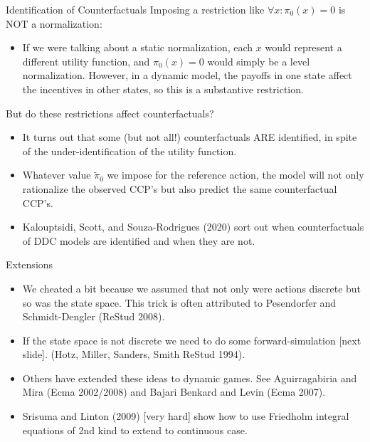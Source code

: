 \begin{frame}{Identification of Counterfactuals}
Imposing a restriction like $\forall x:\pi_{0}\left(x\right)=0$
is NOT a normalization: 
\begin{itemize}
\item If we were talking
about a static normalization, each $x$ would represent a different
utility function, and $\pi_{0}\left(x\right)=0$ would simply be a
level normalization. However, in a dynamic model, the payoffs in one
state affect the incentives in other states, so this is a \alert{substantive
restriction.}
\end{itemize}
But do these restrictions affect counterfactuals?
\begin{itemize}
\item It turns out that some (but not all!) counterfactuals ARE identified, in spite of the
under-identification of the utility function. 
\item Whatever value
$\widetilde{\pi}_{0}$ we impose for the reference action, the model will not only
rationalize the observed CCP's but also predict \alert{the same counterfactual CCP's}.
\item Kalouptsidi, Scott, and Souza-Rodrigues (2020) sort out when counterfactuals
of DDC models are identified and when they are not.
\end{itemize}
\end{frame}

\begin{frame}{Extensions}
\begin{itemize}
\item We cheated a bit because we assumed that not only were actions discrete but so was the state space. This trick is often attributed to Pesendorfer and Schmidt-Dengler (ReStud 2008).
\item If the state space is not discrete we need to do some forward-simulation [next slide]. (Hotz, Miller, Sanders, Smith ReStud 1994).
\item Others have extended these ideas to \alert{dynamic games}. See Aguirragabiria and Mira (Ecma 2002/2008) and Bajari Benkard and Levin (Ecma 2007).
\item Srisuma and Linton (2009) [very hard] show how to use Friedholm integral equations of 2nd kind to extend to continuous case.
\end{itemize}
\end{frame}

